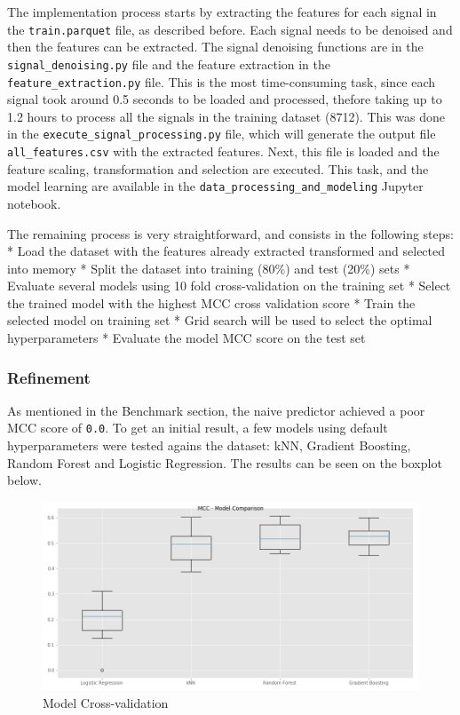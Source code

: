 \documentclass[11pt]{article}
\makeatletter
\def\maxwidth{\ifdim\Gin@nat@width>\linewidth\linewidth
    \else\Gin@nat@width\fi}
\let\Oldincludegraphics\includegraphics
\renewcommand{\includegraphics}[1]{\Oldincludegraphics[width=.8\maxwidth]{#1}}
\makeatother
\begin{document}
The implementation process starts by extracting the features for each
signal in the \texttt{train.parquet} file, as described before. Each
signal needs to be denoised and then the features can be extracted. The
signal denoising functions are in the \texttt{signal\_denoising.py} file
and the feature extraction in the \texttt{feature\_extraction.py} file.
This is the most time-consuming task, since each signal took around 0.5
seconds to be loaded and processed, thefore taking up to 1.2 hours to
process all the signals in the training dataset (8712). This was done in
the \texttt{execute\_signal\_processing.py} file, which will generate
the output file \texttt{all\_features.csv} with the extracted features.
Next, this file is loaded and the feature scaling, transformation and
selection are executed. This task, and the model learning are available
in the \texttt{data\_processing\_and\_modeling} Jupyter notebook.

The remaining process is very straightforward, and consists in the
following steps: * Load the dataset with the features already extracted
transformed and selected into memory * Split the dataset into training
(80\%) and test (20\%) sets * Evaluate several models using 10 fold
cross-validation on the training set * Select the trained model with the
highest MCC cross validation score * Train the selected model on
training set * Grid search will be used to select the optimal
hyperparameters * Evaluate the model MCC score on the test set

\hypertarget{refinement}{%
\subsubsection{Refinement}\label{refinement}}

As mentioned in the Benchmark section, the naive predictor achieved a
poor MCC score of \texttt{0.0}. To get an initial result, a few models
using default hyperparameters were tested agains the dataset: kNN,
Gradient Boosting, Random Forest and Logistic Regression. The results
can be seen on the boxplot below.

\begin{figure}
\centering
\includegraphics{model_cross_val_trial.png}
\caption{Model Cross-validation}
\end{figure}
\end{document}
